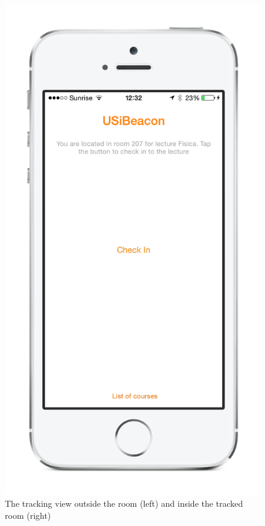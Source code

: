 \begin{figure}[htbp]
\begin{center}
\includegraphics[scale=0.5]{img/iphone_founded.png}
\caption{The tracking view outside the room (left) and inside the tracked room (right)}
\label{checkinview}
\end{center}
\end{figure}

